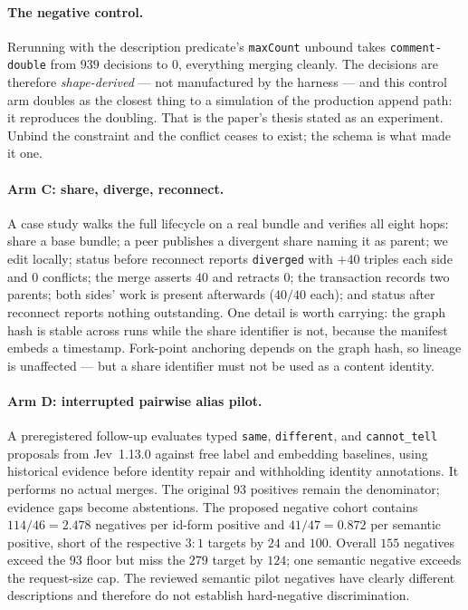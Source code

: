 \paragraph{The negative control.} Rerunning with the description predicate's
\texttt{maxCount} unbound takes \texttt{comment-double} from $939$ decisions to
$0$, everything merging cleanly. The decisions are therefore \emph{shape-derived}
--- not manufactured by the harness --- and this control arm doubles as the
closest thing to a simulation of the production append path: it reproduces the
doubling. That is the paper's thesis stated as an experiment. Unbind the
constraint and the conflict ceases to exist; the schema is what made it one.

\paragraph{Arm C: share, diverge, reconnect.} A case study walks the full
lifecycle on a real bundle and verifies all eight hops: share a base bundle;
a peer publishes a divergent share naming it as parent; we edit locally; status
before reconnect reports \texttt{diverged} with $+40$ triples each side and $0$
conflicts; the merge asserts $40$ and retracts $0$; the transaction records two
parents; both sides' work is present afterwards ($40/40$ each); and status after
reconnect reports nothing outstanding. One detail is worth carrying: the graph
hash is stable across runs while the share identifier is not, because the
manifest embeds a timestamp. Fork-point anchoring depends on the graph hash, so
lineage is unaffected --- but a share identifier must not be used as a content
identity.

\paragraph{Arm D: interrupted pairwise alias pilot.}
A preregistered follow-up evaluates typed \texttt{same}, \texttt{different},
and \texttt{cannot\_tell} proposals from Jev~1.13.0 against free label and
embedding baselines, using historical evidence before identity repair and
withholding identity annotations. It performs no actual merges. The original
$93$ positives remain the denominator; evidence gaps become abstentions.
The proposed negative cohort contains $114/46=2.478$ negatives per id-form
positive and $41/47=0.872$ per semantic positive, short of the respective
$3{:}1$ targets by $24$ and $100$. Overall $155$ negatives exceed the $93$
floor but miss the $279$ target by $124$; one semantic negative exceeds the
request-size cap. The reviewed semantic pilot negatives have clearly different
descriptions and therefore do not establish hard-negative discrimination.


